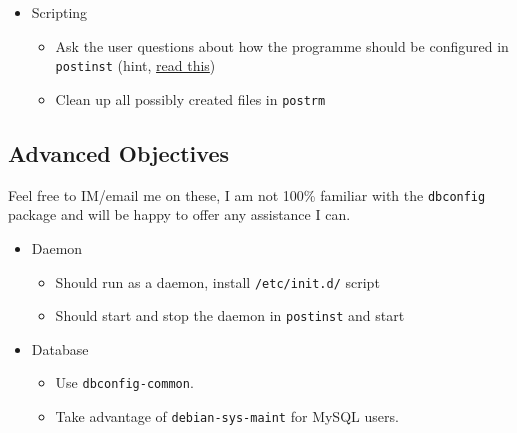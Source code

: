 \documentclass[]{article}
\begin{document}
\begin{itemize}
\item
  Scripting
  \begin{itemize}
  \item
    Ask the user questions about how the programme should be configured
    in \texttt{postinst} (hint,
    \href{http://www.fifi.org/doc/debconf-doc/tutorial.html}{read this})
  \item
    Clean up all possibly created files in \texttt{postrm}
  \end{itemize}
\end{itemize}
\subsection{Advanced Objectives}

Feel free to IM/email me on these, I am not 100\% familiar with the
\texttt{dbconfig} package and will be happy to offer any assistance I
can.

\begin{itemize}
\item
  Daemon
  \begin{itemize}
  \item
    Should run as a daemon, install \texttt{/etc/init.d/} script
  \item
    Should start and stop the daemon in \texttt{postinst} and start
  \end{itemize}
\item
  Database
  \begin{itemize}
  \item
    Use \texttt{dbconfig-common}.
  \item
    Take advantage of \texttt{debian-sys-maint} for MySQL users.
  \end{itemize}
\end{itemize}
\end{document}
